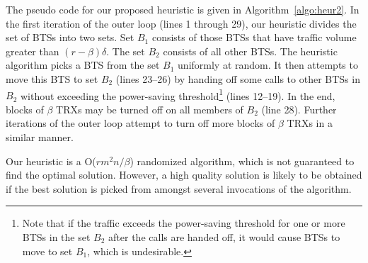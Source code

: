 The pseudo code for our proposed heuristic is given in Algorithm~\ref{algo:heur2}. In the first iteration of the outer loop (lines 1 through 29), our heuristic divides the set of BTSs into two sets.
Set $B_1$ consists of those BTSs that have traffic volume greater than $(r-\beta)\delta$. The set $B_2$ consists of all other BTSs.
The heuristic algorithm picks a BTS from the set $B_1$ uniformly at random.
It then attempts to move this BTS to set $B_2$ (lines 23--26) by handing off some calls to other BTSs in $B_2$ without exceeding the power-saving threshold\footnote{Note that if the traffic exceeds the power-saving threshold for one or more BTSs in the set $B_2$ after the calls are handed off, it would cause BTSs to move to set $B_1$, which is undesirable.} (lines 12--19).
In the end, blocks of $\beta$ TRXs may be turned off on all members of $B_2$ (line 28).
Further iterations of the outer loop attempt to turn off more blocks of $\beta$ TRXs in a similar manner.

Our heuristic is a O($rm^2n/\beta$) randomized algorithm, which is not guaranteed to find the optimal solution. However, a high quality solution is likely to be obtained if the best solution is picked from amongst several invocations of the algorithm.

